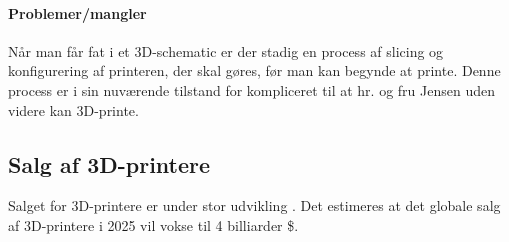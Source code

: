 
\paragraph{Problemer/mangler} %
\label{par:problemer_mangler}

Når man får fat i et 3D-schematic er der stadig en process af slicing og konfigurering af printeren, der skal gøres, før man kan begynde at printe. Denne process er i sin nuværende tilstand for kompliceret til at hr. og fru Jensen uden videre kan 3D-printe.


\subsection{Salg af 3D-printere}

Salget for 3D-printere er under stor udvikling \autocite{wohler_sales_2012}. Det estimeres at det globale salg af 3D-printere i 2025 vil vokse til 4 billiarder \$. \autocite[110]{manyika_disruptive_2013}









